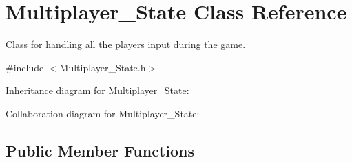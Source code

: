 \hypertarget{classMultiplayer__State}{}\section{Multiplayer\+\_\+\+State Class Reference}
\label{classMultiplayer__State}


Class for handling all the players input during the game.  




{\ttfamily \#include $<$Multiplayer\+\_\+\+State.\+h$>$}



Inheritance diagram for Multiplayer\+\_\+\+State\+:


Collaboration diagram for Multiplayer\+\_\+\+State\+:
\subsection*{Public Member Functions}
